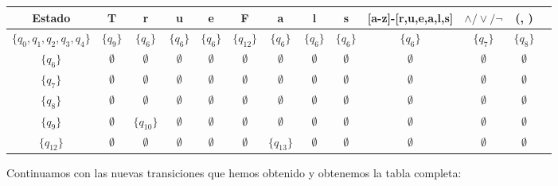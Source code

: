 \begin{table}[h!]
\centering
\begin{tabular}{|c|c|c|c|c|c|c|c|c|c|c|c|c|}
\hline
Estado &T & r & u & e & F & a & l &s &[a-z]-[r,u,e,a,l,s] &$\land/\lor/\lnot$ & (, )\\ \hline
\hline
$\{q_0, q_1, q_2, q_3, q_4\}$ & $\{q_9\}$ & $\{q_6\}$ & $\{q_6\}$ & $\{q_{6}\}$ & $\{q_{12}\}$ & $\{q_6\}$ & $\{q_6\}$ & $\{q_6\}$ & $\{q_6\}$ & $\{q_7\}$& $\{q_8\}$\\ \hline
$\{q_6\}$ & $\emptyset$ & $\emptyset$ & $\emptyset$ & $\emptyset$ & $\emptyset$ & $\emptyset$ & $\emptyset$ & $\emptyset$ & $\emptyset$ & $\emptyset$ & $\emptyset$\\ \hline
$\{q_7\}$ & $\emptyset$ & $\emptyset$ & $\emptyset$ & $\emptyset$ & $\emptyset$ & $\emptyset$ & $\emptyset$ & $\emptyset$ & $\emptyset$ & $\emptyset$ & $\emptyset$\\ \hline
$\{q_8\}$ & $\emptyset$ & $\emptyset$ & $\emptyset$ & $\emptyset$ & $\emptyset$ & $\emptyset$ & $\emptyset$ & $\emptyset$ & $\emptyset$ & $\emptyset$ & $\emptyset$\\ \hline
$\{q_9\}$ & $\emptyset$ & $\{q_{10}\}$ & $\emptyset$ & $\emptyset$ & $\emptyset$  & $\emptyset$ & $\emptyset$ & $\emptyset$ & $\emptyset$ & $\emptyset$ & $\emptyset$\\ \hline
$\{q_{12}\}$ & $\emptyset$ & $\emptyset$ & $\emptyset$ & $\emptyset$ & $\emptyset$  & $\{q_{13}\}$ & $\emptyset$ & $\emptyset$& $\emptyset$ & $\emptyset$ & $\emptyset$\\ \hline
\end{tabular}
\end{table}

Continuamos con las nuevas transiciones que hemos obtenido y obtenemos la tabla completa:

